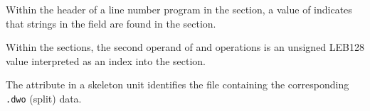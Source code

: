 \begin{description}
\bb
Within the header of a line number program in the \dotdebuglinedwo{}
section, a \HFNdirectoryformattable{} value of \DWFORMstrp{} indicates that
strings in the \HFNdirectories{} field are found in the \dotdebugstrdwo{}
section.
\eb

Within the \dotdebugmacrodwo{} sections, the second operand of \DWMACROdefinestrx{}
and \DWMACROundefstrx{} operations is an unsigned LEB128 value interpreted as an
index into the \dotdebugstroffsetsdwo{} section.
\db

The \DWATdwoname{}
attribute in a skeleton unit identifies the file containing
the corresponding \texttt{.dwo} (split) data.


\end{description}
